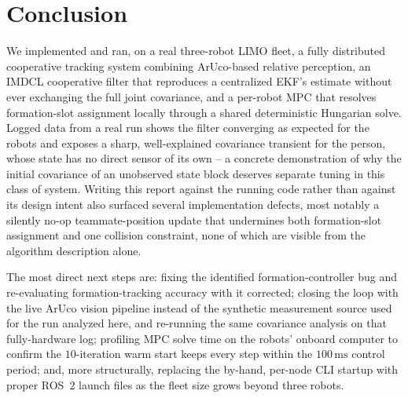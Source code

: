 \documentclass[10pt,conference]{IEEEtran}
\begin{document}
\section{Conclusion}
\label{sec:conclusion}

We implemented and ran, on a real three-robot LIMO fleet, a fully distributed cooperative
tracking system combining ArUco-based relative perception, an IMDCL cooperative filter that
reproduces a centralized EKF's estimate without ever exchanging the full joint covariance, and a
per-robot MPC that resolves formation-slot assignment locally through a shared deterministic
Hungarian solve. Logged data from a real run shows the filter converging as expected for the
robots and exposes a sharp, well-explained covariance transient for the person, whose state has no
direct sensor of its own -- a concrete demonstration of why the initial covariance of an
unobserved state block deserves separate tuning in this class of system. Writing this report
against the running code rather than against its design intent also surfaced several
implementation defects, most notably a silently no-op teammate-position update that undermines
both formation-slot assignment and one collision constraint, none of which are visible from the
algorithm description alone.

The most direct next steps are: fixing the identified formation-controller bug and re-evaluating
formation-tracking accuracy with it corrected; closing the loop with the live ArUco vision
pipeline instead of the synthetic measurement source used for the run analyzed here, and
re-running the same covariance analysis on that fully-hardware log; profiling MPC solve time on
the robots' onboard computer to confirm the $10$-iteration warm start keeps every step within the
$100\,\mathrm{ms}$ control period; and, more structurally, replacing the by-hand, per-node CLI
startup with proper ROS~2 launch files as the fleet size grows beyond three robots.
\end{document}
